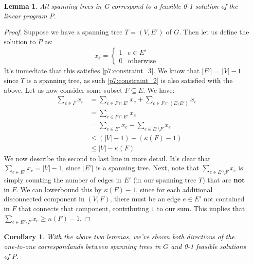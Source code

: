 \documentclass[12pt]{exam}
\newtheorem{corollary}{Corollary}[theorem]
\newtheorem{lemma}[theorem]{Lemma}
\begin{document}
\begin{questions}
\begin{solution}
\begin{enumerate}[label=(\alph*)]
      \begin{lemma}
        All spanning trees in G correspond to a feasible 0-1 solution of the linear program $P$.
      \end{lemma}
      \begin{proof}
        Suppose we have a spanning tree $T = (V, E')$ of $G$. Then let us define the solution to $P$ as:
        \begin{align*}
          x_e = \begin{cases}
            1 & e \in E' \\
            0 & \text{otherwise}
          \end{cases}
        \end{align*}
        It's immediate that this satisfies \ref{p7:constraint_3}. We know that $|E'| = |V| - 1$ since $T$ is a spanning tree, as such \ref{p7:constraint_2} is also satisfied with the above. Let us now consider some subset $F \subseteq E$. We have:
        \begin{align*}
          \sum_{e \in F} x_e &= \sum_{e \in F \cap E'} x_e + \sum_{e \in F \cap (E \setminus E')} x_e \tag{Splitting into edges in $T$ and edges not in $T$} \\
          &= \sum_{e \in F\cap E'} x_e \tag{The second sum consists of just $0$s} \\
          &= \sum_{e \in E'} x_e - \sum_{e \in E' \setminus F} x_e \tag{Rewriting set intersection as subtraction} \\
          &\leq (|V| - 1) - (\kappa(F) - 1) \tag{ See below. } \\
          &\leq |V| - \kappa(F)
        \end{align*}
        We now describe the second to last line in more detail. It's clear that $\sum_{e \in E'} x_e = |V| - 1$, since $|E'|$ is a spanning tree. Next, note that $\sum_{e \in E'\setminus F} x_e$ is simply counting the number of edges in $E'$ (in our spanning tree $T$) that are \textbf{not} in $F$. We can lowerbound this by $\kappa(F) - 1$, since for each additional disconnected component in $(V,F)$, there must be an edge $e \in E'$ not contained in $F$ that connects that component, contributing $1$ to our sum. This implies that $\sum_{e \in E' \setminus F} x _e \geq \kappa(F) - 1$.
      \end{proof}

      \begin{corollary}
        With the above two lemmas, we've shown both directions of the one-to-one correspondands between spanning trees in $G$ and 0-1 feasible solutions of $P$.
      \end{corollary}


\end{enumerate}
\end{solution}
\end{questions}
\end{document}
